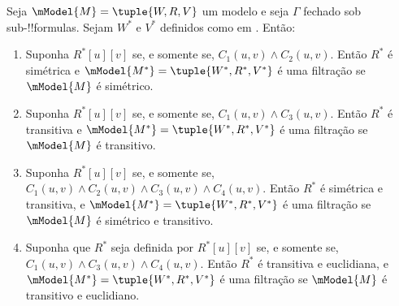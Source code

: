 \documentclass[../../../include/open-logic-section]{subfiles}
\begin{document}
\begin{thm}
  Seja $\mModel{M} =\tuple{W,R,V}$ um modelo e seja $\Gamma$ fechado sob
  sub-!!{formula}s. Sejam $W^*$ e $V^*$ definidos como em
  . Então:
  \begin{enumerate}
  \item Suponha $R^*[u][v]$ se, e somente se, $C_1(u, v) \land
    C_2(u,v)$. Então $R^*$ é simétrica e $\mModel{M^*} =
    \tuple{W^*,R^*,V^*}$ é uma filtração se $\mModel{M}$ é simétrico.
  \item Suponha $R^*[u][v]$ se, e somente se, $C_1(u, v)
    \land C_3(u,v)$. Então $R^*$ é transitiva e
    $\mModel{M^*}=\tuple{W^*,R^*,V^*}$ é uma filtração se $\mModel{M}$
    é transitivo.
  \item Suponha $R^*[u][v]$ se, e somente se, $C_1(u, v) \land C_2(u,v)
    \land C_3(u,v) \land C_4(u,v)$. Então $R^*$ é simétrica e
    transitiva, e $\mModel{M^*}=\tuple{W^*,R^*,V^*}$ é uma filtração
    se $\mModel{M}$ é simétrico e transitivo.
  \item Suponha que $R^*$ seja definida por $R^*[u][v]$ se, e somente
    se, $C_1(u, v) \land C_3(u,v) \land C_4(u,v)$. Então $R^*$ é
    transitiva e euclidiana, e $\mModel{M^*}=\tuple{W^*,R^*,V^*}$ é uma
    filtração se $\mModel{M}$ é transitivo e euclidiano.
  \end{enumerate}
\end{thm}
\end{document}
